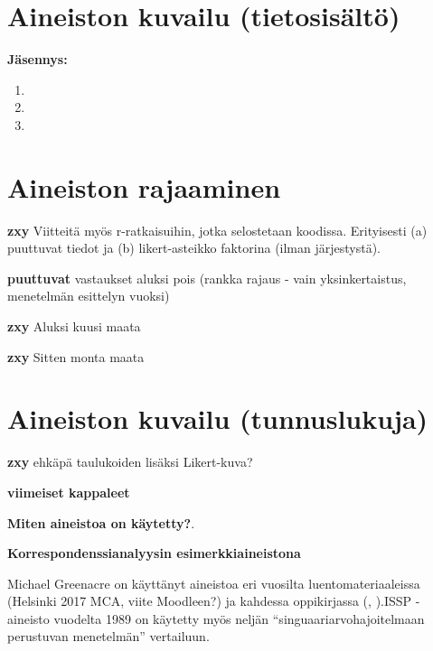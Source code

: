 \documentclass[
  finnish,
]{book}
\begin{document}
\hypertarget{aineiston-kuvailu-tietosisuxe4ltuxf6}{%
\section{Aineiston kuvailu (tietosisältö)}\label{aineiston-kuvailu-tietosisuxe4ltuxf6}}

\textbf{Jäsennys:}

\begin{enumerate}
\def\labelenumi{\arabic{enumi}.}
\item
\item
\item
\end{enumerate}

\hypertarget{aineiston-rajaaminen}{%
\section{Aineiston rajaaminen}\label{aineiston-rajaaminen}}

\textbf{zxy} Viitteitä myös r-ratkaisuihin, jotka selostetaan koodissa. Erityisesti (a) puuttuvat tiedot ja (b) likert-asteikko faktorina (ilman järjestystä).

\textbf{puuttuvat} vastaukset aluksi pois (rankka rajaus - vain yksinkertaistus, menetelmän esittelyn vuoksi)

\textbf{zxy} Aluksi kuusi maata

\textbf{zxy} Sitten monta maata

\hypertarget{aineiston-kuvailu-tunnuslukuja}{%
\section{Aineiston kuvailu (tunnuslukuja)}\label{aineiston-kuvailu-tunnuslukuja}}

\textbf{zxy} ehkäpä taulukoiden lisäksi Likert-kuva?

\textbf{viimeiset kappaleet}

\textbf{Miten aineistoa on käytetty?}.

\textbf{Korrespondenssianalyysin esimerkkiaineistona}

Michael Greenacre on käyttänyt aineistoa eri vuosilta luentomateriaaleissa (Helsinki 2017 MCA, viite Moodleen?) ja kahdessa oppikirjassa (\citep{RefWorks:doc:5a857a43e4b0ed2d44664d7c}, \citep{RefWorks:doc:5a857a43e4b0ed2d44664d78}).ISSP - aineisto vuodelta 1989 on käytetty myös neljän ``singuaariarvohajoitelmaan perustuvan menetelmän'' vertailuun\citep{RefWorks:doc:5b6f159ce4b0bc0f31734b76}.
\end{document}
